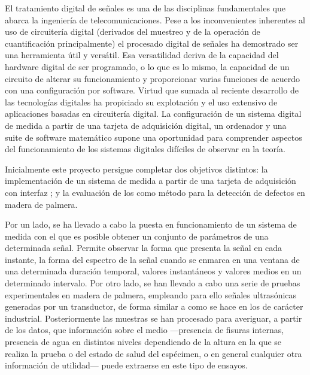 \prosec{}


El tratamiento digital de señales es una de las disciplinas fundamentales
que abarca la ingeniería de telecomunicaciones. Pese a los inconvenientes
inherentes al uso de circuitería digital (derivados del muestreo y de la
operación de cuantificación principalmente) el procesado digital de señales
ha demostrado ser una herramienta útil y versátil. Esa versatilidad deriva
de la capacidad del hardware digital de ser programado, o lo que es lo
mismo, la capacidad de un circuito de alterar su funcionamiento y
proporcionar varias funciones de acuerdo con una configuración por
software. Virtud que sumada al reciente desarrollo de las tecnologías
digitales ha propiciado su explotación y el uso extensivo de aplicaciones
basadas en circuitería digital. La configuración de un sistema digital de
medida a partir de una tarjeta de adquisición digital, un ordenador y una
suite de software matemático supone una oportunidad para comprender
aspectos del funcionamiento de los sistemas digitales difíciles de observar
en la teoría.


\prosec{}


Inicialmente este proyecto persigue completar dos objetivos distintos: la
implementación de un sistema de medida a partir de una tarjeta de
adquisición con interfaz ; y la evaluación de los  como
método para la detección de defectos en madera de palmera.

Por un lado, se ha llevado a cabo la puesta en funcionamiento de un sistema
de medida con el que es posible obtener un conjunto de parámetros de una
determinada señal. Permite observar la forma que presenta la señal en cada
instante, la forma del espectro de la señal cuando se enmarca en una
ventana de una determinada duración temporal, valores instantáneos y
valores medios en un determinado intervalo. Por otro lado, se han llevado a
cabo una serie de pruebas experimentales en madera de palmera, empleando
para ello señales ultrasónicas generadas por un transductor, de forma
similar a como se hace en los  de carácter industrial.
Posteriormente las muestras se han procesado para averiguar, a partir de
los datos, que información sobre el medio ---presencia de fisuras internas,
presencia de agua en distintos niveles dependiendo de la altura en la que
se realiza la prueba o del estado de salud del espécimen, o en general
cualquier otra información de utilidad--- puede extraerse en este tipo de
ensayos.

